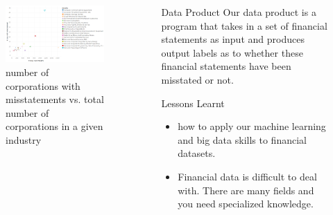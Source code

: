 \documentclass[final]{beamer}
\newlength{\sepwid}
\newlength{\onecolwid}
\begin{document}
\begin{frame}[t]
\begin{columns}[t]
\begin{column}{\onecolwid}
\begin{figure}
\includegraphics[width=1.0\linewidth]{num_corp_with_misstatements.png}
\caption{number of corporations with misstatements vs. total number of corporations in a given industry}
\end{figure} 


\end{column}
\begin{column}{\sepwid}\end{column} %
\begin{column}{\onecolwid} %

\begin{block}{Data Product} 
Our data product is a program that takes in a set of financial statements as input and produces output labels as to whether these financial statements have been misstated or not.
\end{block}

\begin{block}{Lessons Learnt} 
\begin{itemize}
\item how to apply our machine learning and big data skills to financial datasets.
\item Financial data is difficult to deal with. There are many fields and you need specialized knowledge. 
\end{itemize}
\end{block}


\end{column}
\end{columns}
\end{frame}
\end{document}

